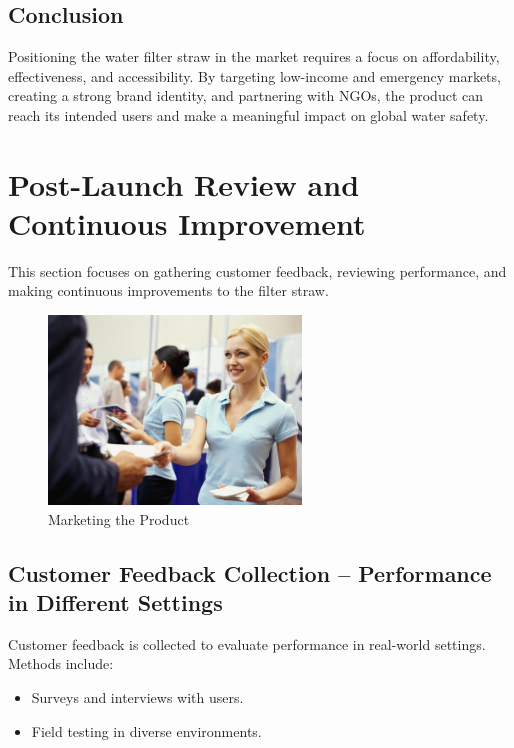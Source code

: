 \documentclass{article}
\begin{document}
\vspace{0.5cm}

\subsection*{Conclusion }
Positioning the water filter straw in the market requires a focus on affordability, effectiveness, and accessibility. By targeting low-income and emergency markets, creating a strong brand identity, and partnering with NGOs, the product can reach its intended users and make a meaningful impact on global water safety.

\newpage







\section{Post-Launch Review and Continuous Improvement}
This section focuses on gathering customer feedback, reviewing performance, and making continuous improvements to the filter straw.

\vspace{0.3cm}

\begin{figure}[h!]
    \centering
    \includegraphics[width=0.6\textwidth]{mark.jpg}
    \caption{Marketing the Product}
    \label{fig:market}
\end{figure}

\vspace{0.5cm}

\subsection{Customer Feedback Collection – Performance in Different Settings}
Customer feedback is collected to evaluate performance in real-world settings. Methods include:
\begin{itemize}
    \item Surveys and interviews with users.
    \item Field testing in diverse environments.
\end{itemize}
\end{document}
